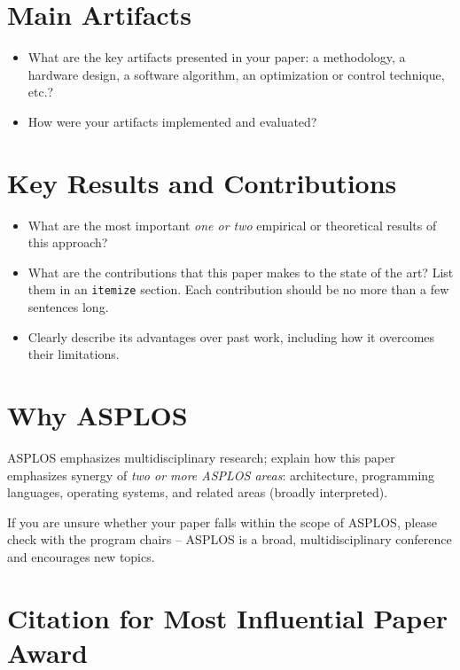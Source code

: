 \section{Main Artifacts}
\label{sec:main-artifacts}

\begin{itemize}
\item What are the key artifacts presented in your paper: a
  methodology, a hardware design, a software algorithm, an
  optimization or control technique, etc.?
  \item How were your artifacts implemented and evaluated? 
\end{itemize}

\section{Key Results and Contributions}
\label{sec:key-contributions}

\begin{itemize}
  \item What are the most important \emph{one or two} empirical or theoretical
    results of this approach?
  \item What are the contributions that this paper makes to the state of the
    art? List them in an \texttt{itemize} section. Each contribution should be no more than a few sentences long.
  \item Clearly describe its advantages over past work, including how it overcomes their limitations.
\end{itemize}

\section{Why ASPLOS}
\label{sec:why-asplos}

ASPLOS emphasizes multidisciplinary research; explain how this
  paper emphasizes synergy of \emph{two or more ASPLOS areas}: architecture,
  programming languages, operating systems, and related areas (broadly
  interpreted).

\noindent
If you are unsure whether your paper falls within the scope of ASPLOS,
please check with the program chairs -- ASPLOS is a broad,
multidisciplinary conference and encourages new topics.

\section{Citation for Most Influential Paper Award}
\label{sec:citation}

